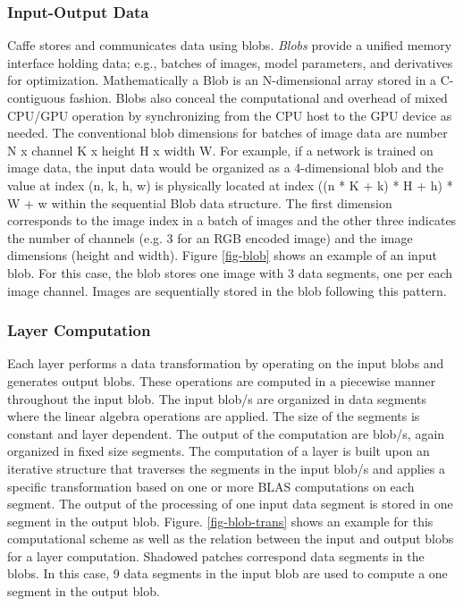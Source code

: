 \subsubsection{Input-Output Data}
Caffe stores and communicates data using blobs. \emph{Blobs} provide a unified memory interface 
holding data; e.g., batches of images, model parameters, and derivatives for optimization.
Mathematically a Blob is an N-dimensional array stored in a C-contiguous fashion. 
Blobs also conceal the computational and overhead of mixed CPU/GPU operation by synchronizing 
from the CPU host to the GPU device as needed. 
The conventional blob dimensions for batches of image data are number N x channel K x height H x width W. 
For example, if a network is trained on image data, the input data would be organized as a 4-dimensional blob and 
the value at index (n, k, h, w) is physically located at index ((n * K + k) * H + h) * W + w within the sequential Blob data structure.
The first dimension corresponds to the image index in a batch of images and the other
three indicates the number of channels (e.g. 3 for an RGB encoded image) and the image dimensions (height and width). Figure \ref{fig-blob}
shows an example of an input blob. For this case, the blob 
stores one image with 3 data segments, one per each image channel. 
Images are sequentially stored in the blob following this pattern. 


\subsubsection{Layer Computation}
Each layer performs a data transformation by operating on the input blobs and generates
output blobs. 
These operations are computed in a piecewise manner 
throughout the input blob. The input blob/s are organized in
data segments where the linear algebra operations are applied. The
size of the segments is constant and layer dependent. The output
of the computation are blob/s, again organized in fixed size
segments. The computation of a layer is built upon an iterative
structure that traverses the segments in the input blob/s and applies
a specific transformation based on one or more BLAS computations 
on each segment. The output of the processing of one input data 
segment is stored in one segment in the output blob. 
Figure. \ref{fig-blob-trans} shows an example for this computational 
scheme as well as the relation between the input and output blobs 
for a layer computation. Shadowed patches correspond data segments 
in the blobs. In this case, 9 data segments in the input blob are 
used to compute a one segment in the output blob. 

